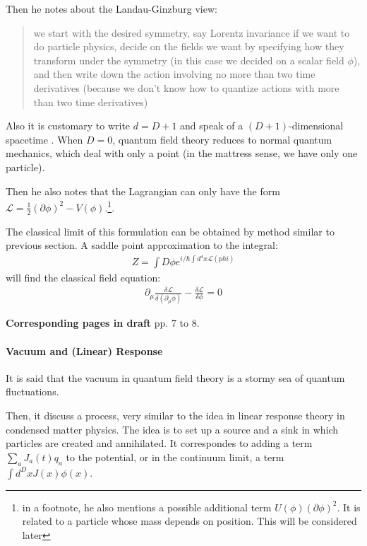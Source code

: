 \documentclass{book}
\numberwithin{equation}{subsection} %
\theoremstyle{definition}
\begin{document}
Then he notes about the Landau-Ginzburg view:

\begin{quote}
    we start with the desired symmetry, say Lorentz invariance if we
    want to do particle physics, decide on the fields we want by 
    specifying how they transform
    under the symmetry (in this case we decided on a scalar field 
    $\phi$), and then write down
    the action involving no more than two time derivatives 
    (because we don’t know how to
    quantize actions with more than two time derivatives)
\end{quote}

Also it is customary to write $d = D + 1$ and speak of a 
$(D + 1)$-dimensional spacetime
. 
When $D=0$, quantum field theory reduces to normal quantum mechanics,
which deal with only a point (in the mattress
sense, we have only one particle).

Then he also notes that the Lagrangian can only have the form
$\mathcal{L}=\frac{1}{2}(\partial\phi)^2-V(\phi)$.\footnote{
    in a footnote, he also mentions a possible additional
    term $U(\phi)(\partial \phi)^2$. It is related to a
    particle whose mass depends on position. This will be
considered later}.

The classical limit of this formulation can be obtained by
method similar to previous section. A saddle point approximation
to the integral:
\begin{align}
    Z = \int D\phi e^{i/\hbar \int d^4x \mathcal{L}(phi)}
\end{align}
will find the classical field equation:
\begin{align}
    \label{eq:QFT_in_a_Nutshell_Part_I.3.classicalFieldEq}
    \partial_\mu \frac{\delta \mathcal{L}}{\delta(\partial_\mu\phi)}
    -\frac{\delta\mathcal{L}}{\delta\phi} =0
\end{align}

\textbf{Corresponding pages in draft} pp. 7 to 8.

\paragraph{Vacuum and (Linear) Response}

It is said that the vacuum in quantum field theory is a
stormy sea of quantum fluctuations.

Then, it discuss a process, very similar to the idea in linear
response theory in condensed matter physics. The idea is to
set up a source and a sink in which particles are created and
annihilated. It correspondes to adding a term $\sum_a J_a(t)q_a$ to
the potential, or in the continuum limit, a term $\int d^DxJ(x)\phi(x)$.
\end{document}
